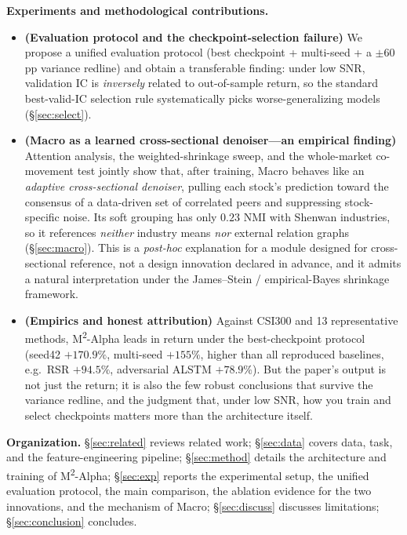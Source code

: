 \documentclass[a4paper,11pt]{article}
\newcommand{\msqa}{\texorpdfstring{M\textsuperscript{2}-Alpha}{M2-Alpha}} %
\begin{document}
\noindent\textbf{Experiments and methodological contributions.}
\begin{itemize}
  \item \textbf{(Evaluation protocol and the checkpoint-selection failure)} We
        propose a unified evaluation protocol (best checkpoint + multi-seed +
        a $\pm 60$pp variance redline) and obtain a transferable finding: under
        low SNR, validation IC is \emph{inversely} related to out-of-sample
        return, so the standard best-valid-IC selection rule systematically
        picks worse-generalizing models (\S\ref{sec:select}).
  \item \textbf{(Macro as a learned cross-sectional denoiser---an empirical
        finding)} Attention analysis, the weighted-shrinkage sweep, and the
        whole-market co-movement test jointly show that, after training, Macro
        behaves like an \emph{adaptive cross-sectional denoiser}, pulling each
        stock's prediction toward the consensus of a data-driven set of
        correlated peers and suppressing stock-specific noise. Its soft
        grouping has only $0.23$ NMI with Shenwan industries, so it references
        \emph{neither} industry means \emph{nor} external relation graphs
        (\S\ref{sec:macro}). This is a \emph{post-hoc} explanation for a module
        designed for cross-sectional reference, not a design innovation declared
        in advance, and it admits a natural interpretation under the
        James--Stein / empirical-Bayes shrinkage framework.
  \item \textbf{(Empirics and honest attribution)} Against CSI300 and 13
        representative methods, \msqa{} leads in return under the best-checkpoint
        protocol (seed42 $+170.9\%$, multi-seed $+155\%$, higher than all
        reproduced baselines, e.g.\ RSR $+94.5\%$, adversarial ALSTM $+78.9\%$).
        But the paper's output is not just the return; it is also the few robust
        conclusions that survive the variance redline, and the judgment that,
        under low SNR, how you train and select checkpoints matters more than the
        architecture itself.
\end{itemize}

\noindent\textbf{Organization.}
\S\ref{sec:related} reviews related work; \S\ref{sec:data} covers data, task,
and the feature-engineering pipeline; \S\ref{sec:method} details the
architecture and training of \msqa{}; \S\ref{sec:exp} reports the experimental
setup, the unified evaluation protocol, the main comparison, the ablation
evidence for the two innovations, and the mechanism of Macro; \S\ref{sec:discuss}
discusses limitations; \S\ref{sec:conclusion} concludes.
\end{document}
